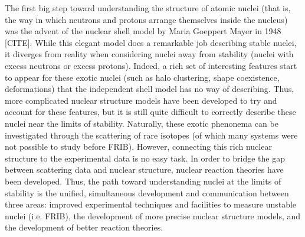 \documentclass[12pt]{article}
\begin{document}
The first big step toward understanding the structure of atomic nuclei (that is, the way in which neutrons and protons arrange themselves inside the nucleus) was the advent of the
nuclear shell model by Maria Goeppert Mayer in 1948 [CITE]. While this elegant model does a remarkable job describing stable nuclei, it diverges from reality when considering
nuclei away from stability (nuclei with excess neutrons or excess protons). Indeed, a rich set of interesting features
start to appear for these exotic nuclei (such as halo clustering, shape coexistence, deformations) that the independent shell model has no way of describing. Thus, more complicated
nuclear structure models have been developed to try and account for these features, but it is still quite difficult to correctly describe these nuclei near the limits of stability.
Naturally, these exotic phenonema can be investigated through the scattering of rare isotopes (of which many systems were not possible to study before FRIB). However, connecting
this rich nuclear structure to the experimental data is no easy task. In order to bridge the gap between scattering data and nuclear structure, nuclear reaction theories have been
developed. Thus, the path toward understanding nuclei at the
limits of stability is the unified, simultaneous development and communication between three areas: improved experimental techniques and facilities to measure unstable nuclei (i.e.
FRIB), the development of more precise nuclear structure models, and the development of better reaction theories. 
\end{document}
